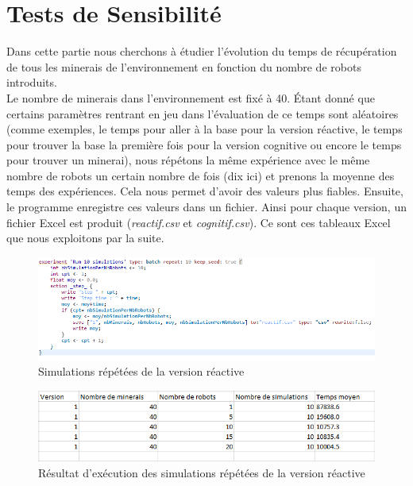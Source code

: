 \chapter{Tests de Sensibilité}
Dans cette partie nous cherchons à étudier l'évolution du temps de récupération de tous les minerais de l'environnement en fonction du nombre de robots introduits. \\
Le nombre de minerais dans l'environnement est fixé à 40. Étant donné que certains paramètres rentrant en jeu dans l'évaluation de ce temps sont aléatoires (comme exemples, le temps pour aller à la base pour la version réactive, le temps pour trouver la base la première fois pour la version cognitive ou encore le temps pour trouver un minerai), nous répétons la même expérience avec le même nombre de robots un certain nombre de fois (dix ici) et prenons la moyenne des temps des expériences. Cela nous permet d'avoir des valeurs plus fiables. Ensuite, le programme enregistre ces valeurs dans un fichier. Ainsi pour chaque version, un fichier Excel est produit (\textit{reactif.csv} et \textit{cognitif.csv}). Ce sont ces tableaux Excel que nous exploitons par la suite. 

\begin{figure}[!h]
	\begin{center}
		\includegraphics{code/simulations_repetees_reactif}
	\end{center}
	\caption{Simulations répétées de la version réactive}
\end{figure}

\begin{figure}[!h]
	\begin{center}
		\includegraphics{code/excel_reactif}
	\end{center}
	\caption{Résultat d'exécution des simulations répétées de la version réactive}
\end{figure}


